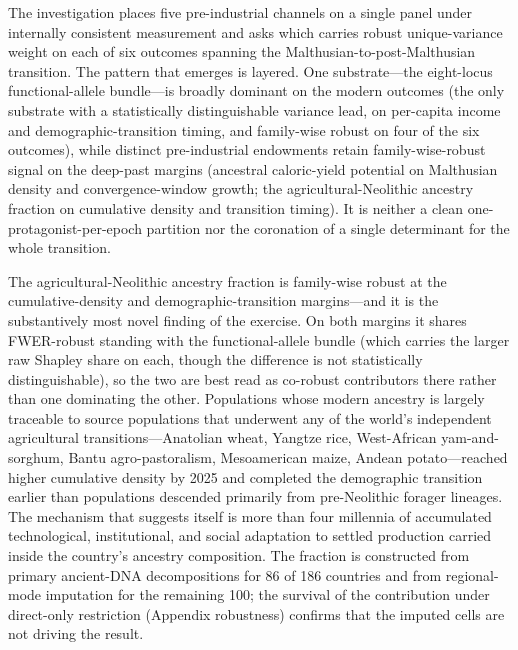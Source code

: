 \documentclass[11pt,letterpaper]{article}
\begin{document}
The investigation places five pre-industrial channels on a single panel under internally consistent measurement and asks which carries robust unique-variance weight on each of six outcomes spanning the Malthusian-to-post-Malthusian transition. The pattern that emerges is layered. One substrate---the eight-locus functional-allele bundle---is broadly dominant on the modern outcomes (the only substrate with a statistically distinguishable variance lead, on per-capita income and demographic-transition timing, and family-wise robust on four of the six outcomes), while distinct pre-industrial endowments retain family-wise-robust signal on the deep-past margins (ancestral caloric-yield potential on Malthusian density and convergence-window growth; the agricultural-Neolithic ancestry fraction on cumulative density and transition timing). It is neither a clean one-protagonist-per-epoch partition nor the coronation of a single determinant for the whole transition.

The agricultural-Neolithic ancestry fraction is family-wise robust at the cumulative-density and demographic-transition margins---and it is the substantively most novel finding of the exercise. On both margins it shares FWER-robust standing with the functional-allele bundle (which carries the larger raw Shapley share on each, though the difference is not statistically distinguishable), so the two are best read as co-robust contributors there rather than one dominating the other. Populations whose modern ancestry is largely traceable to source populations that underwent any of the world's independent agricultural transitions---Anatolian wheat, Yangtze rice, West-African yam-and-sorghum, Bantu agro-pastoralism, Mesoamerican maize, Andean potato---reached higher cumulative density by 2025 and completed the demographic transition earlier than populations descended primarily from pre-Neolithic forager lineages. The mechanism that suggests itself is more than four millennia of accumulated technological, institutional, and social adaptation to settled production carried inside the country's ancestry composition. The fraction is constructed from primary ancient-DNA decompositions for 86 of 186 countries and from regional-mode imputation for the remaining 100; the survival of the contribution under direct-only restriction (Appendix robustness) confirms that the imputed cells are not driving the result.
\end{document}
